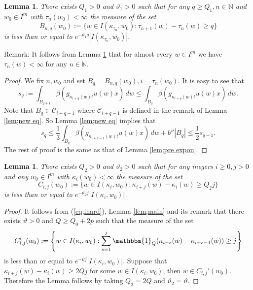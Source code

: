 \documentclass[12pt]{amsart}
\newtheorem{lem}[thm]{Lemma}
\theoremstyle{definition}
\theoremstyle{remark}
\numberwithin{equation}{section}
\begin{document}
\begin{lem}\label{lem;new exp}
There exists   $Q_1>0$ and $\vartheta_1>0$ such that for any $q\ge Q_1, n\in \mathbb N$ and $w_0\in I^m$
with $\tau_n(w_0)<\infty$ the measure of the  set 
\[
B_{n,q}(w_0):=\{w\in I(\kappa_{\tau_n}, w_0): \tau_{n+1}(w)-\tau_n(w)\ge q\}
\]
is less than or equal to 
$ e^{-\vartheta_1 q}|I(\kappa_{\tau_n},w_0)|$.
\end{lem}
Remark: It follows from Lemma \ref{lem;new exp} that for almost every $w\in I^m$
we have $\tau_n(w)<\infty$ for any $n\in \mathbb N$.
\begin{proof}
We fix $n, w_0$ and set  $B_q =B_{n, q}(w_0), i=\tau_n(w_0)$. It is easy to see that
\[
s_q:=\int_{B_{q+1}}\beta(g_{\kappa_{i+q}(w)t}u(w)x)\,dw\le \int_{B_{q}}\beta(g_{\kappa_{i+q}(w)t}u(w)x)\,dw.
\] 
Note that $B_{q}\in\mathcal C_{i+q-1}$ where $\mathcal C_{i+q-1}$ is defined 
in the remark of Lemma \ref{lem;new eq}. So Lemma \ref{lem;new eq} implies that
 \begin{equation}
s_q  \le  \frac{1}{3}\int_{B_{q}}\beta(g_{\kappa_{i+q-1}(w)t}u(w)x)\,dw+b''|B_{q}|\le \frac{1}{2}s_{q-1}.
\end{equation}
The rest of proof is the same as that of Lemma \ref{lem;pre expon}.
\end{proof}

\begin{lem}\label{lem;morelem}
There exists $Q_2>0$  and $\vartheta_2>0$ such that for any inegers
$i\ge 0, j>0 $  and  any  $w_0\in I^m$ with $\kappa_i(w_0)<\infty$
the measure of the set 
\begin{equation}\label{eq;indexplane}
C_{i, j}(w_0):=\{w\in I(\kappa_i,w_0): \kappa_{i+j}(w)-\kappa_i(w)\ge Q_2j\}
\end{equation}
is less than or equal to $e^{-\vartheta_2 j}|I(\kappa_i,w_0)|$.
\end{lem}
\begin{proof}
It follows from 
(\ref{eq;lhard}),
 Lemma \ref{lem;main} and its remark that there exists $\vartheta>0$ and $Q\ge Q_0+2p$ such that
 the measure of the set 
 \[
C_{i,j}' (w_0):= \left \{w\in I(\kappa_i,w_0): \sum_{s=1}^j\mathbbm{1}_Q
 (\kappa_{i+s}(w)-\kappa_{i+s-1}(w))\ge j\right\} 
 \]
is less than or equal to $e^{-\vartheta j}|I(\kappa_i,w_0)|$.
Suppose that $\kappa_{i+j}(w)-\kappa_i(w)\ge 2Qj$ for some 
$w\in I(\kappa_i,w_0)$, then $w\in C_{i,j}' (w_0)$.
Therefore the Lemma follows 
by taking $Q_2=2Q$ and $\vartheta_2=\vartheta$.
\end{proof}
\end{document}

